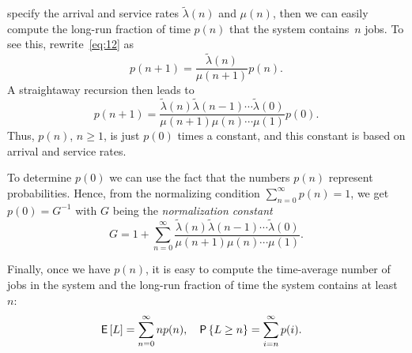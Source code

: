 \documentclass[queueing-book.tex]{subfiles}
\begin{document}
 specify
the arrival and service rates $\tilde \lambda(n)$ and $\mu(n)$, then we can easily compute the long-run fraction of time $p(n)$ that the system contains~$n$ jobs.
To see this, rewrite~\cref{eq:12} as
\begin{equation}\label{eq:25}
 p(n+1) = \frac{\tilde \lambda(n)}{\mu(n+1)}p(n).
\end{equation}
A straightaway recursion then leads to
\begin{equation*}
 p(n+1) = \frac{\tilde \lambda(n)\tilde\lambda(n-1)\cdots \tilde \lambda(0)}{\mu(n+1)\mu(n)\cdots \mu(1)}p(0).
\end{equation*}
Thus, $p(n)$, $n\geq 1$, is just $p(0)$ times a constant, and this constant is based on  arrival and service rates.

To determine $p(0)$ we can use the fact that the numbers $p(n)$ represent probabilities.
Hence, from the normalizing condition $\sum_{n=0}^\infty p(n)=1$, we get $p(0) = G^{-1}$ with
$G$ being the \emph{normalization constant}
\begin{equation*}
G = 1+\sum_{n=0}^\infty \frac{\tilde \lambda(n)\tilde \lambda(n-1)\cdots\tilde \lambda(0)}{\mu(n+1)\mu(n)\cdots \mu(1)}.
\end{equation*}

Finally, once we have $p(n)$, it is easy to compute  the time-average number of jobs in the system and the long-run fraction of time the system contains at least~$n$:
\begin{align*}
\,\mathsf{E}\left[L\right] &= \sum_{n=0}^\infty n p(n), & \,\mathsf{P}\left\{L \geq n\right\} &= \sum_{i=n}^\infty p(i).
\end{align*}
\end{document}
